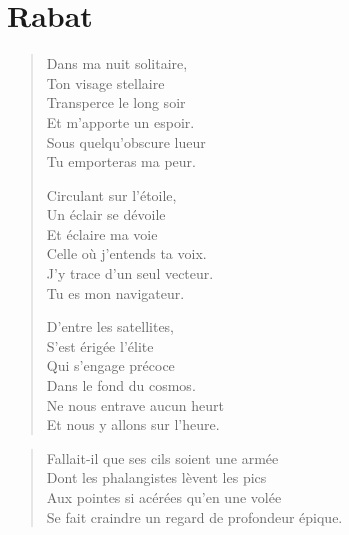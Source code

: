 \section*{Rabat}

\begin{verse}\sizain
  Dans ma nuit solitaire,\\ 
  Ton visage stellaire\\ 
  Transperce le long soir\\ 
  Et m’apporte un espoir.\\ 
  Sous quelqu’obscure lueur\\ 
  Tu emporteras ma peur.  %

  Circulant sur l’étoile,\\ 
  Un éclair se dévoile\\ 
  Et éclaire ma voie\\ 
  Celle où j’entends ta voix.\\ 
  J’y trace d’un seul vecteur.\\ 
  Tu es mon navigateur.  %

  D’entre les satellites,\\ 
  S’est érigée l’élite\\ 
  Qui s’engage précoce\\ 
  Dans le fond du cosmos.\\ 
  Ne nous entrave aucun heurt\\ 
  Et nous y allons sur l’heure.  %
\end{verse}

\begin{verse}\quatrain
  Fallait-il que ses cils soient une armée\\ 
  Dont les phalangistes lèvent les pics\\ 
  Aux pointes si acérées qu’en une volée\\ 
  Se fait craindre un regard de profondeur épique.\\ 
\end{verse}

